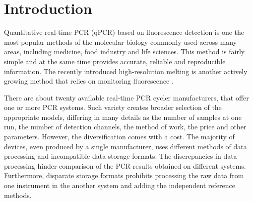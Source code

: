 \documentclass{bioinfo}
\begin{document}
	\section{Introduction}
	
	Quantitative real-time PCR (qPCR) based on fluorescence detection is one the
	most popular methods of the molecular biology commonly used across many areas,
	including medicine, food industry and life sciences. This method is fairly
	simple and at the same time provides accurate, reliable and reproducible
	information\cite{kubista_real-time_2006}. The recently introduced
	high-resolution melting is another actively growing method that relies on
	monitoring fluorescence
	\cite{reed_high-resolution_2007}\cite{wittwer_high-resolution_2009}.
	
	There are about twenty available real-time PCR cycler manufacturers, that offer 
	one or more PCR systems. Such variety creates broader selection of the 
	appropriate models, differing in many details as the number of samples at 
	one run, the number of detection channels, the 
	method of work, the price and other parameters. However, the diversification
	comes with a cost. The majority of devices, even produced by a single
	manufacturer, uses different methods of data processing and incompatible data
	storage formats. The discrepancies in data processing hinder comparison of the
	PCR results obtained on different systems. Furthermore, disparate storage
	formats prohibits processing the raw data from one instrument in the another
	system and adding the independent reference methods.
	
\end{document}
